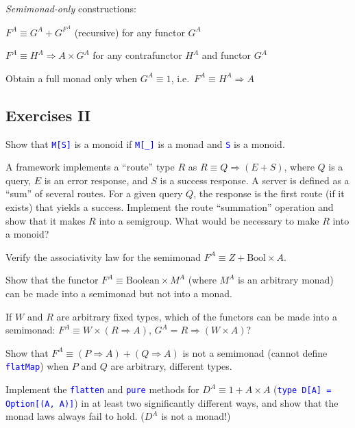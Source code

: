 \emph{Semimonad-only} constructions:

$F^{A}\equiv G^{A}+G^{F^{A}}$ (recursive) for any functor $G^{A}$

$F^{A}\equiv H^{A}\Rightarrow A\times G^{A}$ for any contrafunctor
$H^{A}$ and functor $G^{A}$

Obtain a full monad only when $G^{A}\equiv1$, i.e.\ $F^{A}\equiv H^{A}\Rightarrow A$


\subsection{Exercises II}

\vspace*{-0.2cm}Show that \texttt{\textcolor{blue}{\footnotesize{}M{[}S{]}}}
is a monoid if \texttt{\textcolor{blue}{\footnotesize{}M{[}\_{]}}}
is a monad and \texttt{\textcolor{blue}{\footnotesize{}S}} is a monoid.

A framework implements a ``route'' type $R$ as $R\equiv Q\Rightarrow\left(E+S\right)$,
where $Q$ is a query, $E$ is an error response, and $S$ is a success
response. A server is defined as a ``sum'' of several routes. For
a given query $Q$, the response is the first route (if it exists)
that yields a success. Implement the route ``summation'' operation
and show that it makes $R$ into a semigroup. What would be necessary
to make $R$ into a monoid?

Verify the associativity law for the semimonad $F^{A}\equiv Z+\text{Bool}\times A$.

Show that the functor $F^{A}\equiv\text{Boolean}\times M^{A}$ (where
$M^{A}$ is an arbitrary monad) can be made into a semimonad but not
into a monad.

If $W$ and $R$ are arbitrary fixed types, which of the functors
can be made into a semimonad: $F^{A}\equiv W\times\left(R\Rightarrow A\right)$,
$G^{A}=R\Rightarrow\left(W\times A\right)$?

Show that $F^{A}\equiv\left(P\Rightarrow A\right)+\left(Q\Rightarrow A\right)$
is not a semimonad (cannot define \texttt{\textcolor{blue}{\footnotesize{}flatMap}})
when $P$ and $Q$ are arbitrary, different types.

Implement the \texttt{\textcolor{blue}{\footnotesize{}flatten}} and
\texttt{\textcolor{blue}{\footnotesize{}pure}} methods for $D^{A}\equiv1+A\times A$
(\texttt{\textcolor{blue}{\footnotesize{}type D{[}A{]} = Option{[}(A,
A){]}}}) in at least two significantly different ways, and show that
the monad laws always fail to hold. ($D^{A}$ is not a monad!)


